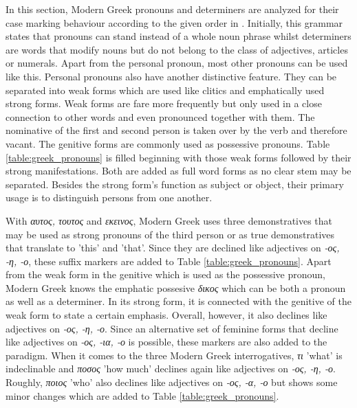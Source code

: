 \documentclass[11pt,a4paper,twoside,openright]{scrbook}
\begin{document}
In this section, Modern Greek pronouns and determiners are analyzed for their case marking behaviour according to the given order in \citet{holton2016greek}. Initially, this grammar states that pronouns can stand instead of a whole noun phrase whilst determiners are words that modify nouns but do not belong to the class of adjectives, articles or numerals. Apart from the personal pronoun, most other pronouns can be used like this. 
Personal pronouns also have another distinctive feature. They can be separated into weak forms which are used like clitics and emphatically used strong forms. Weak forms are fare more frequently but only used in a close connection to other words and even pronounced together with them. The nominative of the first and second person is taken over by the verb and therefore vacant. The genitive forms are commonly used as possessive pronouns. Table \ref{table:greek_pronouns} is filled beginning with those weak forms followed by their strong manifestations. Both are added as full word forms as no clear stem may be separated. Besides the strong form's function as subject or object, their primary usage is to distinguish persons from one another. 

With \foreignlanguage{greek}{\textit{αυτος, τουτος} and \textit{εκεινος}}, Modern Greek uses three demonstratives that may be used as strong pronouns of the third person or as true demonstratives that translate to 'this' and 'that'. Since they are declined like adjectives on \foreignlanguage{greek}{\textit{-ος, -η, -ο}}, these suffix markers are added to Table \ref{table:greek_pronouns}. Apart from the weak form in the genitive which is used as the possessive pronoun, Modern Greek knows the emphatic possesive \foreignlanguage{greek}{\textit{δικος}} which can be both a pronoun as well as a determiner. In its strong form, it is connected with the genitive of the weak form to state a certain emphasis. Overall, however, it also declines like  adjectives on \foreignlanguage{greek}{\textit{-ος, -η, -ο}}. Since an alternative set of feminine forms that decline like  adjectives on \foreignlanguage{greek}{\textit{-ος, -ια, -ο}} is possible, these markers are also added to the paradigm. When it comes to the three Modern Greek interrogatives, \foreignlanguage{greek}{\textit{τι}} 'what' is indeclinable and \foreignlanguage{greek}{\textit{ποσος}} 'how much' declines again like  adjectives on \foreignlanguage{greek}{\textit{-ος, -η, -ο}}. Roughly, \foreignlanguage{greek}{\textit{ποιος}} 'who' also declines like  adjectives on \foreignlanguage{greek}{\textit{-ος, -α, -ο}} but shows some minor changes which are added to Table \ref{table:greek_pronouns}. 
\end{document}
